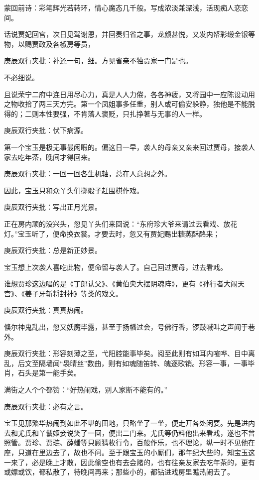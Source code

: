 \begin{parag}
    \begin{note}蒙回前诗：彩笔辉光若转环，情心魔态几千般。写成浓淡兼深浅，活现痴人恋恋间。\end{note}
\end{parag}


\begin{parag}
    话说贾妃回宫，次日见驾谢恩，并回奏归省之事，龙颜甚悦，又发内帑彩缎金银等物，以赐贾政及各椒房等员，\begin{note}庚辰双行夹批：补还一句，细。方见省亲不独贾家一门是也。\end{note}不必细说。
\end{parag}


\begin{parag}
    且说荣宁二府中连日用尽心力，真是人人力倦，各各神疲，又将园中一应陈设动用之物收拾了两三天方完。第一个凤姐事多任重，别人或可偷安躲静，独他是不能脱得的；二则本性要强，不肯落人褒贬，只扎挣著与无事的人一样。\begin{note}庚辰双行夹批：伏下病源。\end{note}第一个宝玉是极无事最闲暇的。偏这日一早，袭人的母亲又亲来回过贾母，接袭人家去吃年茶，晚间才得回来。\begin{note}庚辰双行夹批：一回一回各生机轴，总在人意想之外。\end{note}因此，宝玉只和众丫头们掷骰子赶围棋作戏。\begin{note}庚辰双行夹批：写出正月光景。\end{note}正在房内顽的没兴头，忽见丫头们来回说：“东府珍大爷来请过去看戏、放花灯。”宝玉听了，便命换衣裳。才要去时，忽又有贾妃赐出糖蒸酥酪来；\begin{note}庚辰双行夹批：总是新正妙景。\end{note}宝玉想上次袭人喜吃此物，便命留与袭人了。自己回过贾母，过去看戏。
\end{parag}


\begin{parag}
    谁想贾珍这边唱的是《丁郎认父》、《黄伯央大摆阴魂阵》，更有《孙行者大闹天宫》、《姜子牙斩将封神》等类的戏文。\begin{note}庚辰双行夹批：真真热闹。\end{note}倏尔神鬼乱出，忽又妖魔毕露，甚至于扬幡过会，号佛行香，锣鼓喊叫之声闻于巷外。\begin{note}庚辰双行夹批：形容刻薄之至，弋阳腔能事毕矣。阅至此则有如耳内喧哗、目中离乱，后文至隔墙闻“袅晴丝”数曲，则有如魂随笛转、魄逐歌销。形容一事，一事毕肖，石头是第一能手矣。\end{note}满街之人个个都赞：“好热闹戏，别人家断不能有的。”\begin{note}庚辰双行夹批：必有之言。\end{note}宝玉见那繁华热闹到如此不堪的田地，只略坐了一坐，便走开各处闲耍。先是进内去和尤氏和丫鬟姬妾说笑了一回，便出二门来。尤氏等仍料他出来看戏，遂也不曾照管。贾珍、贾琏、薛蟠等只顾猜枚行令，百般作乐，也不理论，纵一时不见他在座，只道在里边去了，故也不问。至于跟宝玉的小厮们，那年纪大些的，知宝玉这一来了，必是晚上才散，因此偷空也有去会赌的，也有往亲友家去吃年茶的，更有或嫖或饮，都私散了，待晚间再来；那些小的，都钻进戏房里瞧热闹去了。
\end{parag}



